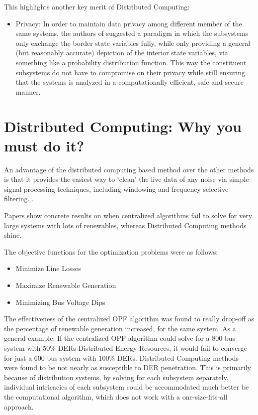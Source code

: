 \documentclass[journal]{IEEEtran}
\begin{document}
This highlights another key merit of Distributed Computing:
\begin{itemize}
	\item Privacy: In order to maintain data privacy among different member of the same systems, the authors of \cite{aladinAlgorithmPaper} suggested a paradigm in which the subsystems only exchange the border state variables fully, while only providing a general (but reasonably accurate) depiction of the interior state variables, via something like a probability distribution function. This way the constituent subsystems do not have to compromise on their privacy while still ensuring that the systems is analyzed in a computationally efficient, safe and secure manner.
\end{itemize} 

\section{Distributed Computing: Why you must do it?}
\label{comparison}
An advantage of the distributed computing based method over the other methods is that it provides the easiest way to `clean' the live data of any noise via simple signal processing techniques, including windowing and frequency selective filtering. .

Papers \cite{rabayet01, rabayet02} show concrete results on when centralized algorithms fail to solve for very large systems with lots of renewables, whereas Distributed Computing methods shine.

The objective functions for the optimization problems were as follows:
\begin{itemize}
	\item Minimize Line Losses
	\item Maximize Renewable Generation
	\item Minimizing Bus Voltage Dips
\end{itemize}

The effectiveness of the centralized OPF algorithm was found to really drop-off as the percentage of renewable generation increased, for the same system.
As a general example: If the centralized OPF algorithm could solve for a $800$ bus system with $50\%$ DERs Distributed Energy Resources, it would fail to converge for just a $600$ bus system with $100\%$ DERs.
Distributed Computing methods were found to be not nearly as susceptible to DER penetration. This is primarily because of distribution systems, by solving for each subsystem separately, individual intricacies of each subsystem could be accommodated much better be the computational algorithm, which does not work with a one-size-fits-all approach.
\end{document}
